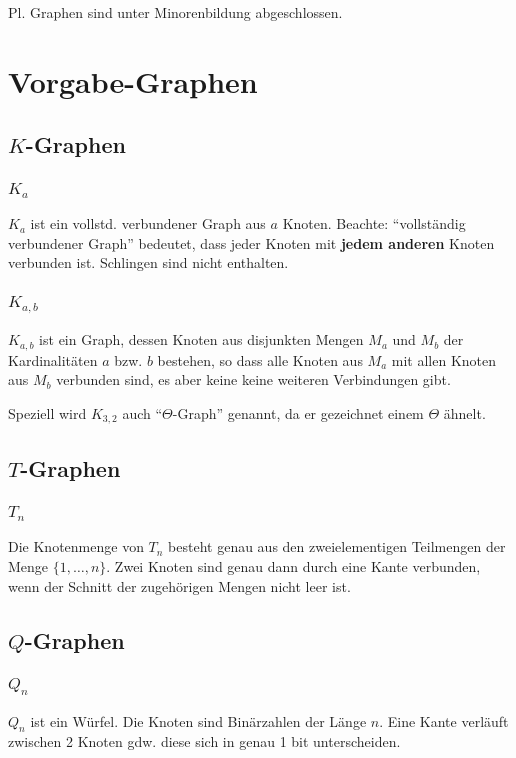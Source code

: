 \documentclass[a4paper,11pt]{report}
\begin{document}
Pl. Graphen sind unter Minorenbildung abgeschlossen.


\chapter{Vorgabe-Graphen}
\section{$K$-Graphen}
\subsection{$K_a$}
$K_a$ ist ein vollstd. verbundener Graph aus $a$ Knoten. Beachte: ``vollständig verbundener Graph'' bedeutet, dass jeder Knoten mit {\bf jedem anderen} Knoten verbunden ist. Schlingen sind nicht enthalten.


\subsection{$K_{a, b}$}
$K_{a, b}$ ist ein Graph, dessen Knoten aus disjunkten Mengen $M_a$ und $M_b$ der Kardinalitäten $a$ bzw. $b$ bestehen, so dass alle Knoten aus $M_a$ mit allen Knoten aus $M_b$ verbunden sind, es aber keine keine weiteren Verbindungen gibt.

Speziell wird $K_{3, 2}$ auch ``$\Theta$-Graph'' genannt, da er gezeichnet einem $\Theta$ ähnelt.


\section{$T$-Graphen}
\subsection{$T_n$}
Die Knotenmenge von $T_n$ besteht genau aus den zweielementigen Teilmengen der Menge $\{1, \ldots, n\}$. Zwei Knoten sind genau dann durch eine Kante verbunden, wenn der Schnitt der zugehörigen Mengen nicht leer ist.


\section{$Q$-Graphen}
\subsection{$Q_n$}
$Q_n$ ist ein Würfel. Die Knoten sind Binärzahlen der Länge $n$. Eine Kante verläuft zwischen 2 Knoten gdw. diese sich in genau 1 bit unterscheiden.
\end{document}
